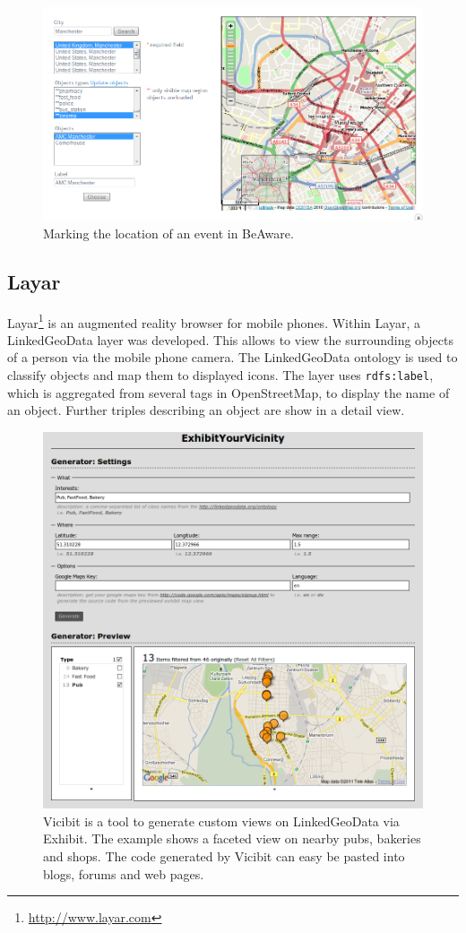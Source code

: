 \begin{figure}[htb]
	\includegraphics[width=.85\textwidth]{images/BeAware1}
	\caption{Marking the location of an event in BeAware.}
	\label{fig:beaware}
\end{figure}

\subsection{Layar}

Layar\footnote{\url{http://www.layar.com}} is an augmented reality browser for mobile phones. Within Layar, a LinkedGeoData layer was developed. This allows to view the surrounding objects of a person via the mobile phone camera. The LinkedGeoData ontology is used to classify objects and map them to displayed icons. The layer uses \verb|rdfs:label|, which is aggregated from several tags in OpenStreetMap, to display the name of an object. Further triples describing an object are show in a detail view.

\begin{figure}
	\includegraphics[width=.45\textwidth]{images/vicibit}
	\caption{Vicibit is a tool to generate custom views on LinkedGeoData via Exhibit. The example shows a faceted view on nearby pubs, bakeries and shops. The code generated by Vicibit can easy be pasted into blogs, forums and web pages.}
	\label{fig:vicibit}
\end{figure}

